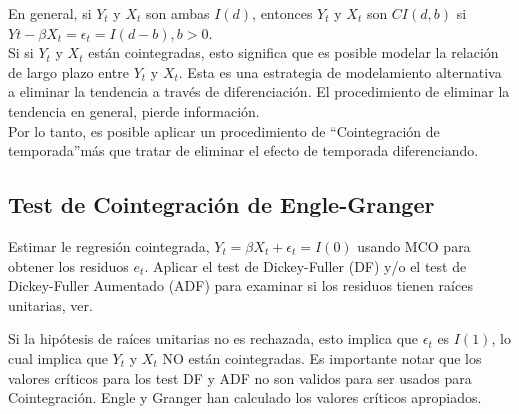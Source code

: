 		En general, si $Y_t$ y $X_t$ son ambas $I(d)$, entonces $Y_t$ y $X_t$ son $CI(d,b)$ si $Yt - \beta X_t = \epsilon_t  = I(d-b), b>0.$\\
		\vspace{4mm}	
		Si si $Y_t$ y $X_t$ est\'an cointegradas, esto significa que es posible modelar la relaci\'on de largo plazo entre $Y_t$ y $X_t$. Esta es una estrategia de modelamiento alternativa a eliminar la tendencia a trav\'es de diferenciaci\'on. El procedimiento de eliminar la tendencia en general, pierde informaci\'on. \\
		\vspace{4mm}	
		Por lo tanto, es posible aplicar un procedimiento de \textquotedblleft Cointegraci\'on de temporada\textquotedblright m\'as que tratar de eliminar el efecto de temporada diferenciando.\\
		

\subsection{Test de Cointegraci\'on de Engle-Granger}
		Estimar le regresi\'on cointegrada, $Y_t = \beta X_t + \epsilon_t = I(0)$ usando MCO para obtener los residuos $e_t$. Aplicar el test de Dickey-Fuller (DF) y/o el test de Dickey-Fuller Aumentado (ADF) para examinar si los residuos tienen ra\'{i}ces unitarias, ver\cite{engle1987co}. \\
		
		\vspace{4mm}	
		
		Si la hip\'otesis de ra\'{i}ces unitarias no es rechazada, esto implica que $\epsilon_t$ es $I(1)$, lo cual implica que $Y_t$ y $X_t$ NO est\'an cointegradas. Es importante notar que los valores cr\'{i}ticos para los test DF y ADF no son validos para ser usados para Cointegraci\'on. Engle y Granger han calculado los valores cr\'{i}ticos apropiados.
		

